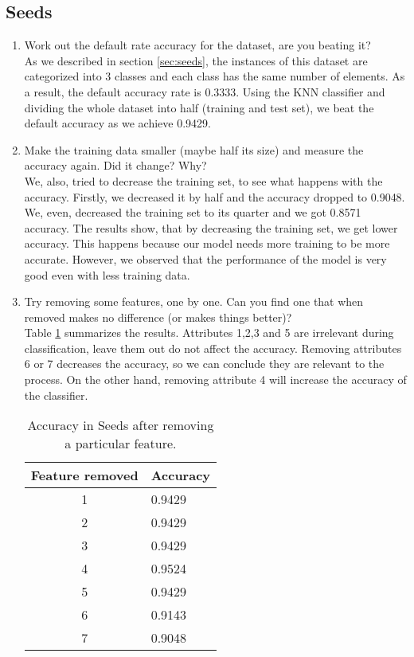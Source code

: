 \documentclass[10pt]{scrartcl}
\begin{document}
\subsection{Seeds}
\begin{enumerate}
 \item Work out the default rate accuracy for the dataset, are you beating it? \\
 As we described in section \ref{sec:seeds}, the instances of this dataset are categorized into 3 classes and each class has the same number of elements. As a result, the default accuracy rate is 0.3333. Using the KNN classifier and dividing the whole dataset into half (training and test set), we beat the default accuracy as we achieve 0.9429.
 
 \item Make the training data smaller (maybe half its size) and measure the accuracy again. Did it change? Why? \\ 
 We, also, tried to decrease the training set, to see what happens with the accuracy. Firstly, we decreased it by half and the accuracy dropped to 0.9048. We, even, decreased the training set to its quarter and we got 0.8571 accuracy. The results show, that by decreasing the training set, we get lower accuracy. This happens because our model needs more training to be more accurate. However, we observed that the performance of the model is very good even with less training data. 
 
 \item Try removing some features, one by one. Can you find one that when removed makes no difference (or makes things better)? \\
 Table \ref{tab:acc3} summarizes the results. Attributes 1,2,3 and 5 are irrelevant during classification, leave them out do not affect the accuracy. Removing attributes 6 or 7 decreases the accuracy, so we can conclude they are relevant to the process.  On the other hand, removing attribute 4 will increase the accuracy of the classifier.

 \begin{table}[h!]
 \centering
 \begin{tabular}{cl}
  \toprule
  \textbf{Feature removed} & \textbf{Accuracy} \\
  \midrule
  1  & 0.9429 \\ 
  2  & 0.9429 \\  
  3  & 0.9429 \\  
  4  & 0.9524 \\  
  5  & 0.9429 \\  
  6  & 0.9143 \\  
  7  & 0.9048 \\
  \bottomrule
 \end{tabular}
 \caption{Accuracy in Seeds after removing a particular feature.}\label{tab:acc3}
 \end{table}


\end{enumerate}
\end{document}
